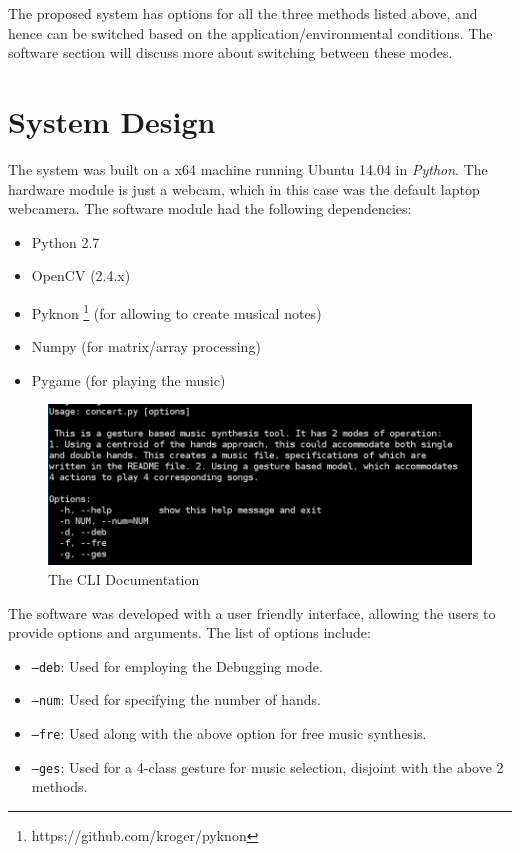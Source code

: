 \documentclass[letterpaper, 10 pt, twoside, conference]{ieeeconf}
\begin{document}
The proposed system has options for all the three methods listed above, and hence can be switched based
on the application/environmental conditions. The software section will discuss more about switching between these modes.

\section{System Design}
The system was built on a x64 machine running Ubuntu 14.04 in \textit{Python}. The hardware module is just a webcam,
which in this case was the default laptop webcamera. The software module had the following dependencies:
\begin{itemize}
  \item Python 2.7
  \item OpenCV (2.4.x)
  \item Pyknon \footnote{https://github.com/kroger/pyknon} (for allowing to create musical notes)
  \item Numpy (for matrix/array processing)
  \item Pygame (for playing the music)
\end{itemize}
\begin{figure}[h]
  \centering
  \includegraphics[width=\columnwidth]{concert.png}
  \caption{The CLI Documentation}
  \label{Overall1}
\end{figure}
The software was developed with a user friendly interface, allowing the users to provide
options and arguments. The list of options include:
\begin{itemize}
  \item \texttt{--deb}: Used for employing the Debugging mode.
  \item \texttt{--num}: Used for specifying the number of hands.
  \item \texttt{--fre}: Used along with the above option for free music synthesis.
  \item \texttt{--ges}: Used for a 4-class gesture for music selection, disjoint with the
    above 2 methods.
\end{itemize}
\end{document}
